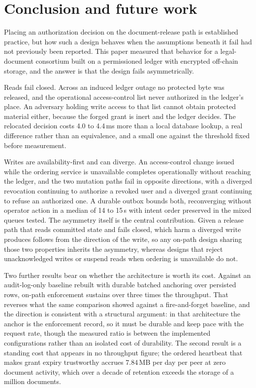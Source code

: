 \documentclass[preprint,12pt]{elsarticle}
\begin{document}
\section{Conclusion and future work}
\label{sec:conclusion}

Placing an authorization decision on the document-release path is established
practice, but how such a design behaves when the assumptions beneath it fail
had not previously been reported. This paper measured that behavior for a
legal-document consortium built on a permissioned ledger with encrypted
off-chain storage, and the answer is that the design fails asymmetrically.

Reads fail closed. Across an induced ledger outage no protected byte was
released, and the operational access-control list never authorized in the
ledger's place. An adversary holding write access to that list cannot obtain
protected material either, because the forged grant is inert and the ledger
decides. The relocated decision costs 4.0 to 4.4\,ms more than a local
database lookup, a real difference rather than an equivalence, and a small one
against the threshold fixed before measurement.

Writes are availability-first and can diverge. An access-control change issued
while the ordering service is unavailable completes operationally without
reaching the ledger, and the two mutation paths fail in opposite directions,
with a diverged revocation continuing to authorize a revoked user and a
diverged grant continuing to refuse an authorized one. A durable outbox bounds
both, reconverging without operator action in a median of 14 to 15\,s with
intent order preserved in the mixed queues tested. The asymmetry itself is
the central contribution. Given a release path that reads committed state and
fails closed, which harm a diverged write produces follows from the direction
of the write, so any on-path design sharing those two properties inherits the
asymmetry, whereas designs that reject unacknowledged writes or suspend reads
when ordering is unavailable do not.

Two further results bear on whether the architecture is worth its cost.
Against an audit-log-only baseline rebuilt with durable batched anchoring over
persisted rows, on-path enforcement sustains over three times the throughput.
That reverses what the same comparison showed against a fire-and-forget
baseline, and the direction is consistent with a structural argument: in that
architecture the anchor is the enforcement record, so it must be durable and
keep pace with the request rate, though the measured ratio is between the
implemented configurations rather than an isolated cost of durability. The second result is a standing cost that appears in no
throughput figure; the ordered heartbeat that makes grant expiry trustworthy
accrues 7.84\,MB per day per peer at zero document activity, which over a
decade of retention exceeds the storage of a million documents.
\end{document}
